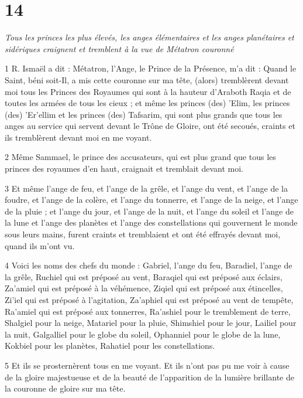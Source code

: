 \chapter{14}

\par \textit{Tous les princes les plus élevés, les anges élémentaires et les anges planétaires et sidériques craignent et tremblent à la vue de Métatron couronné}

\par 1 R. Ismaël a dit : Métatron, l'Ange, le Prince de la Présence, m'a dit : Quand le Saint, béni soit-Il, a mis cette couronne sur ma tête, (alors) tremblèrent devant moi tous les Princes des Royaumes qui sont à la hauteur d'Araboth Raqia et de toutes les armées de tous les cieux ; et même les princes (des) 'Elim, les princes (des) 'Er'ellim et les princes (des) Tafsarim, qui sont plus grands que tous les anges au service qui servent devant le Trône de Gloire, ont été secoués, craints et ils tremblèrent devant moi en me voyant.

\par 2 Même Sammael, le prince des accusateurs, qui est plus grand que tous les princes des royaumes d'en haut, craignait et tremblait devant moi.

\par 3 Et même l'ange de feu, et l'ange de la grêle, et l'ange du vent, et l'ange de la foudre, et l'ange de la colère, et l'ange du tonnerre, et l'ange de la neige, et l'ange de la pluie ; et l'ange du jour, et l'ange de la nuit, et l'ange du soleil et l'ange de la lune et l'ange des planètes et l'ange des constellations qui gouvernent le monde sous leurs mains, furent craints et tremblaient et ont été effrayés devant moi, quand ils m'ont vu.

\par 4 Voici les noms des chefs du monde : Gabriel, l'ange du feu, Baradiel, l'ange de la grêle, Ruchiel qui est préposé au vent, Baraqiel qui est préposé aux éclairs, Za'amiel qui est préposé à la véhémence, Ziqiel qui est préposé aux étincelles, Zi'iel qui est préposé à l'agitation, Za'aphiel qui est préposé au vent de tempête, Ra'amiel qui est préposé aux tonnerres, Ra'ashiel pour le tremblement de terre, Shalgiel pour la neige, Matariel pour la pluie, Shimshiel pour le jour, Lailiel pour la nuit, Galgalliel pour le globe du soleil, Ophanniel pour le globe de la lune, Kokbiel pour les planètes, Rahatiel pour les constellations.

\par 5 Et ils se prosternèrent tous en me voyant. Et ils n’ont pas pu me voir à cause de la gloire majestueuse et de la beauté de l’apparition de la lumière brillante de la couronne de gloire sur ma tête.

